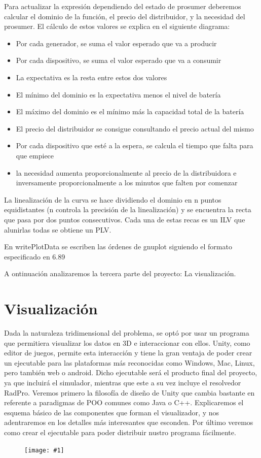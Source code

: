 \documentclass[12pt,a4paper,openright,oneside]{article}
\newcommand{\includeImage}[1]
{
	\begin{figure}[htb]
	\begin{center}
	\texttt{[image: \#1]}
	\end{center}
	\end{figure}
}
\numberwithin{equation}{section}
\theoremstyle{definition}
\begin{document}
Para actualizar la expresión dependiendo del estado de prosumer deberemos calcular el dominio de la función, el precio del distribuidor, y la necesidad del prosumer. El cálculo de estos valores se explica en el siguiente diagrama:
\begin{itemize}
        \item Por cada generador, se suma el valor esperado que va a producir
        \item Por cada dispositivo, se suma el valor esperado que va a consumir
        \item La expectativa es la resta entre estos dos valores
        \item El mínimo del dominio es la expectativa menos el nivel de batería
        \item El máximo del dominio es el mínimo más la capacidad total de la batería
        \item El precio del distribuidor se consigue consultando el precio actual del mismo
        \item Por cada dispositivo que esté a la espera, se calcula el tiempo que falta para que empiece
        \item la necesidad aumenta proporcionalmente al precio de la distribuidora e inversamente proporcionalmente a los minutos que falten por comenzar
\end{itemize}

La linealización de la curva se hace dividiendo el dominio en n puntos equidistantes (n controla la precisión de la linealización) y se encuentra la recta que pasa por dos puntos consecutivos. Cada una de estas recas es un ILV que alunirlas todas se obtiene un PLV.

En writePlotData se escriben las órdenes de gnuplot siguiendo el formato especificado en 6.89


A ontinuación analizaremos la tercera parte del proyecto: La visualización.
\newpage




\section{Visualización}

Dada la naturaleza tridimensional del problema, se optó por usar un programa que permitiera visualizar los datos en 3D e interaccionar con ellos. Unity, como editor de juegos, permite esta interacción y tiene la gran ventaja de poder crear un ejecutable para las plataformas más reconocidas como Windows, Mac, Linux, pero también web o android. Dicho ejecutable será el producto final del proyecto, ya que incluirá el simulador, mientras que este a su vez incluye el resolvedor RadPro. Veremos primero la filosofía de diseño de Unity que cambia bastante en referente a paradigmas de POO comunes como Java o C++. Explicaremos el esquema básico de las componentes que forman el visualizador, y nos adentraremos en los detalles más interesantes que esconden. Por último veremos como crear el ejecutable para poder distribuir nustro programa fácilmente.
\includeImage{visualization.png}
\end{document}
